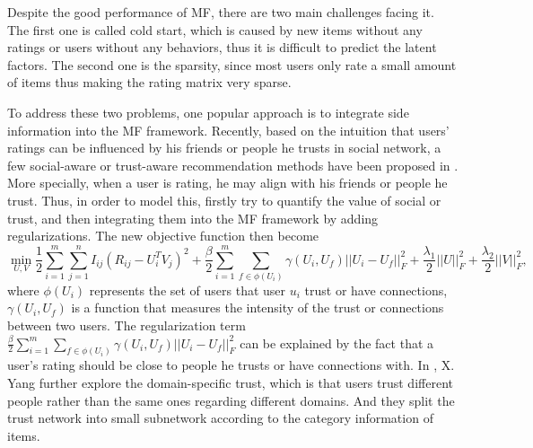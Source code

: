 Despite the good performance of MF, there are two main challenges facing it. The first one is called cold start, which is caused by new items without any ratings or users without any behaviors, thus it is difficult to predict the latent factors. 
The second one is the sparsity, since most users only rate a small amount of items thus making the rating matrix very sparse.

To address these two problems, one popular approach is to integrate side information into the MF framework. Recently, based on the intuition that users' ratings can be influenced by his friends or people he trusts in social network, a few social-aware or trust-aware recommendation methods have been proposed in \cite{jamali2010matrix}\cite{ma2009llearningEnsembel}\cite{ma2009learningTrust}\cite{ma2008sorec}\cite{ma2011recommender}\cite{massa2004trust}\cite{yang2013social}. More specially, when a user is rating, he may align with his friends or people he trust. Thus, in order to model this, \cite{jamali2010matrix}\cite{ma2009llearningEnsembel}\cite{ma2009learningTrust}\cite{ma2008sorec}\cite{ma2011recommender}\cite{massa2004trust} firstly try to quantify the value of social or trust, and then integrating them into the MF framework by adding regularizations. The new objective function then become
\begin{equation}
\min_{U,V}\frac{1}{2}\sum_{i=1}^{m}\sum_{j=1}^{n}I_{ij}(R_{ij} - U_i^TV_j)^2 + \frac{\beta}{2}\sum_{i=1}^{m}\sum_{f \in \phi(U_i)}\gamma(U_i, U_f)||U_i - U_f||_F^2 + \frac{\lambda_1}{2}||U||_F^2 + \frac{\lambda_2}{2}||V||_F^2,
\end{equation} 
where $\phi(U_i)$ represents the set of users that user $u_i$ trust or have connections, $\gamma(U_i,U_f)$ is a function that measures the intensity of the trust or connections between two users. The regularization term $\frac{\beta}{2}\sum_{i=1}^{m}\sum_{f \in \phi(U_i)}\gamma(U_i, U_f)||U_i - U_f||_F^2$ can be explained by the fact that a user's rating should be close to people he trusts or have connections with. In \cite{yang2012circle}, X. Yang further explore the domain-specific trust, which is that users trust different people rather than the same ones regarding different domains. And they split the trust network into small subnetwork according to the category information of items. 

